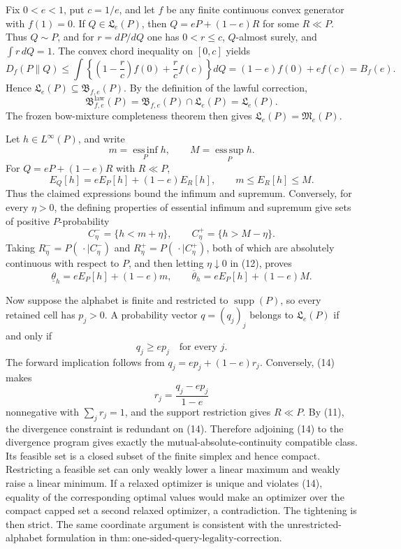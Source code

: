 Fix \(0<e<1\), put \(c=1/e\), and let \(f\) be any finite continuous convex generator with \(f(1)=0\).  If \(Q\in\mathfrak L_e(P)\), then \(Q=eP+(1-e)R\) for some \(R\ll P\).  Thus \(Q\sim P\), and for \(r=dP/dQ\) one has \(0<r\le c\), \(Q\)-almost surely, and \(\int r\,dQ=1\).  The convex chord inequality on \([0,c]\) yields
\[
 D_f(P\|Q)
 \le\int\left\{\left(1-\frac rc\right)f(0)+\frac rc f(c)\right\}dQ
 =(1-e)f(0)+ef(c)=B_f(e). \tag{11}
\]
Hence \(\mathfrak L_e(P)\subseteq\mathfrak B_{f,e}(P)\).  By the definition of the lawful correction,
\[
 \mathfrak B^{\mathrm{law}}_{f,e}(P)
 =\mathfrak B_{f,e}(P)\cap\mathfrak L_e(P)
 =\mathfrak L_e(P).
\]
The frozen bow-mixture completeness theorem then gives \(\mathfrak L_e(P)=\mathfrak M_e(P)\).

Let \(h\in L^\infty(P)\), and write
\[
 m=\operatorname*{ess\,inf}_P h,\qquad M=\operatorname*{ess\,sup}_P h.
\]
For \(Q=eP+(1-e)R\) with \(R\ll P\),
\[
 E_Q[h]=eE_P[h]+(1-e)E_R[h],\qquad m\le E_R[h]\le M. \tag{12}
\]
Thus the claimed expressions bound the infimum and supremum.  Conversely, for every \(\eta>0\), the defining properties of essential infimum and supremum give sets of positive \(P\)-probability
\[
 C^-_\eta=\{h<m+\eta\},\qquad C^+_\eta=\{h>M-\eta\}.
\]
Taking \(R^-_\eta=P(\,\cdot\mid C^-_\eta)\) and \(R^+_\eta=P(\,\cdot\mid C^+_\eta)\), both of which are absolutely continuous with respect to \(P\), and then letting \(\eta\downarrow0\) in (12), proves
\[
 \underline\theta_h=eE_P[h]+(1-e)m,\qquad
 \overline\theta_h=eE_P[h]+(1-e)M. \tag{13}
\]

Now suppose the alphabet is finite and restricted to \(\operatorname{supp}(P)\), so every retained cell has \(p_j>0\).  A probability vector \(q=(q_j)_j\) belongs to \(\mathfrak L_e(P)\) if and only if
\[
 q_j\ge ep_j\quad\text{for every }j. \tag{14}
\]
The forward implication follows from \(q_j=ep_j+(1-e)r_j\).  Conversely, (14) makes
\[
 r_j=\frac{q_j-ep_j}{1-e}
\]
nonnegative with \(\sum_jr_j=1\), and the support restriction gives \(R\ll P\).  By (11), the divergence constraint is redundant on (14).  Therefore adjoining (14) to the divergence program gives exactly the mutual-absolute-continuity compatible class.  Its feasible set is a closed subset of the finite simplex and hence compact.  Restricting a feasible set can only weakly lower a linear maximum and weakly raise a linear minimum.  If a relaxed optimizer is unique and violates (14), equality of the corresponding optimal values would make an optimizer over the compact capped set a second relaxed optimizer, a contradiction.  The tightening is then strict.  The same coordinate argument is consistent with the unrestricted-alphabet formulation in \(\mathrm{thm:one\text{-}sided\text{-}query\text{-}legality\text{-}correction}\).

